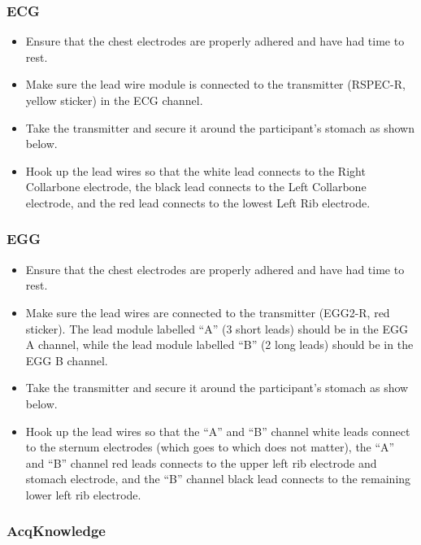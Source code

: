 \documentclass[]{book}
\providecommand{\tightlist}{%
  \setlength{\itemsep}{0pt}\setlength{\parskip}{0pt}}
\begin{document}
\hypertarget{ecg}{%
\subsubsection{ECG}\label{ecg}}

\begin{itemize}
\tightlist
\item
  Ensure that the chest electrodes are properly adhered and have had time to rest.
\item
  Make sure the lead wire module is connected to the transmitter (RSPEC-R, yellow sticker) in the ECG channel.
\item
  Take the transmitter and secure it around the participant's stomach as shown below.
\item
  Hook up the lead wires so that the white lead connects to the Right Collarbone electrode, the black lead connects to the Left Collarbone electrode, and the red lead connects to the lowest Left Rib electrode.
\end{itemize}

\hypertarget{egg}{%
\subsubsection{EGG}\label{egg}}

\begin{itemize}
\tightlist
\item
  Ensure that the chest electrodes are properly adhered and have had time to rest.
\item
  Make sure the lead wires are connected to the transmitter (EGG2-R, red sticker). The lead module labelled ``A'' (3 short leads) should be in the EGG A channel, while the lead module labelled ``B'' (2 long leads) should be in the EGG B channel.
\item
  Take the transmitter and secure it around the participant's stomach as show below.
\item
  Hook up the lead wires so that the ``A'' and ``B'' channel white leads connect to the sternum electrodes (which goes to which does not matter), the ``A'' and ``B'' channel red leads connects to the upper left rib electrode and stomach electrode, and the ``B'' channel black lead connects to the remaining lower left rib electrode.
\end{itemize}

\hypertarget{acqknowledge}{%
\subsubsection{AcqKnowledge}\label{acqknowledge}}
\end{document}
